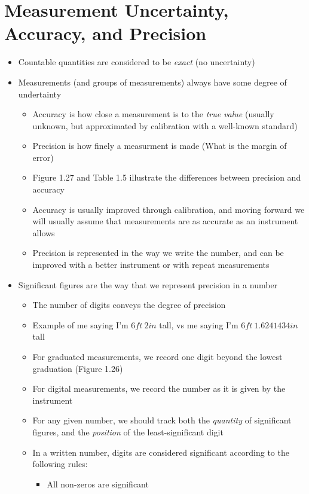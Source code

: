 \documentclass[12pt, openany, letterpaper]{memoir}
\begin{document}
\section{Measurement Uncertainty, Accuracy, and Precision}
\begin{itemize}
  \item Countable quantities are considered to be \emph{exact} (no uncertainty)
  \item Measurements (and groups of measurements) always have some degree of undertainty
  \begin{itemize}
    \item Accuracy is how close a measurement is to the \emph{true value} (usually unknown, but approximated by calibration with a well-known standard)
    \item Precision is how finely a measurment is made (What is the margin of error)
    \item Figure 1.27 and Table 1.5 illustrate the differences between precision and accuracy
    \item Accuracy is usually improved through calibration, and moving forward we will usually assume that measurements are as accurate as an instrument allows
    \item Precision is represented in the way we write the number, and can be improved with a better instrument or with repeat measurements
  \end{itemize}
  \item Significant figures are the way that we represent precision in a number
  \begin{itemize}
    \item The number of digits conveys the degree of precision
    \item Example of me saying I'm $6ft~2in$ tall, vs me saying I'm $6ft~1.6241434in$ tall
    \item For graduated measurements, we record one digit beyond the lowest graduation (Figure 1.26)
    \item For digital measurements, we record the number as it is given by the instrument
    \item For any given number, we should track both the \emph{quantity} of significant figures, and the \emph{position} of the least-significant digit
    \item In a written number, digits are considered significant according to the following rules:
    \begin{itemize}
      \item All non-zeros are significant

\end{itemize}
\end{itemize}
\end{itemize}
\end{document}
